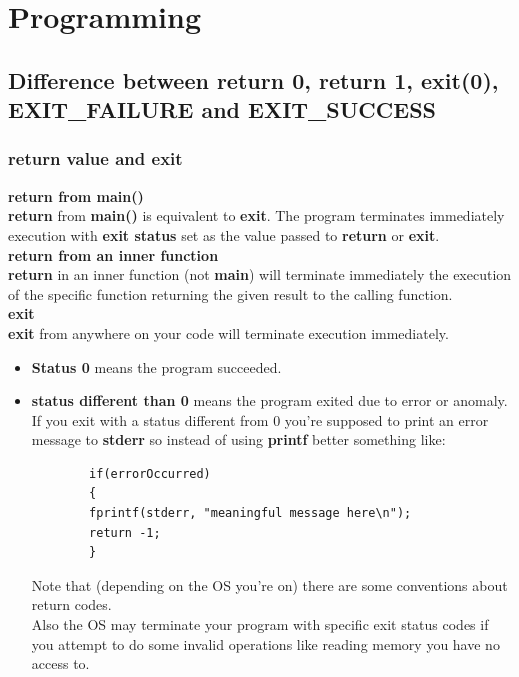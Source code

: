 	\chapter{Programming}

	\section{Difference between return 0, return 1, exit(0), EXIT\_FAILURE and EXIT\_SUCCESS}
	\subsection{return value and exit}
	\addtocounter{seq}{1}
	
	 \textbf{return from main()}\\
	
	\textbf{return} from \textbf{main()} is equivalent to \textbf{exit}. The program terminates immediately execution with \textbf{exit status} set as the value passed to \textbf{return} or \textbf{exit}.\\
	
	 \textbf{return from an inner function}\\
	
	\textbf{return} in an inner function (not \textbf{main}) will terminate immediately the execution of the specific function returning the given result to the calling function.\\
	
	 \textbf{exit}\\
	
	\textbf{exit} from anywhere on your code will terminate execution immediately.\\
	
	\begin{itemize}
		\item \textbf{Status 0} means the program succeeded.
		\item \textbf{status different than 0} means the program exited due to error or anomaly. If you exit with a status different from 0 you're supposed to print an error message to \textbf{stderr} so instead of using \textbf{printf} better something like:
		\begin{verbatim}
		if(errorOccurred)
		{
		fprintf(stderr, "meaningful message here\n");
		return -1;
		}
		\end{verbatim}
		
		Note that (depending on the OS you're on) there are some conventions about return codes.\\
		Also the OS may terminate your program with specific exit status codes if you attempt to do some invalid operations like reading memory you have no access to.
	\end{itemize}
	
